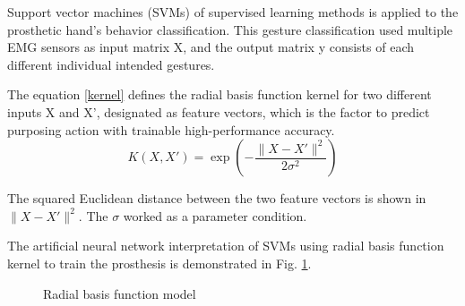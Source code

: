 \documentclass[conference]{IEEEtran}
\begin{document}
Support vector machines (SVMs) \cite{ML1}\cite{ML2} of supervised learning methods is applied to the prosthetic hand's behavior classification. This gesture classification used multiple EMG sensors as input matrix X, and the output matrix y consists of each different individual intended gestures.  

The equation \eqref{kernel} defines the radial basis function kernel for two different inputs X and X', designated as feature vectors, which is the factor to predict purposing action with trainable high-performance accuracy.
\begin{equation}
K(X,X') = \exp(-\frac{\lVert X - X' \rVert^2}{2\sigma^2})
\label{kernel}
\end{equation}

The squared Euclidean distance between the two feature vectors is shown in $\lVert X - X' \rVert^2$.
The $\sigma$ worked as a parameter condition.

The artificial neural network interpretation of SVMs using radial basis function kernel to train the prosthesis is demonstrated in Fig. \ref{RBF}.

\begin{figure}[htp]
\centering
{}
\caption{Radial basis function model}
\label{RBF}

\end{figure}
\end{document}
